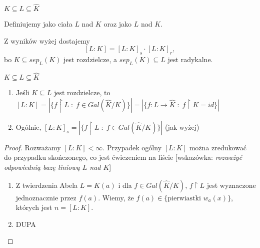 \begin{bbox}
$K\subseteq L\subseteq\hat{K}$

Definiujemy  jako  ciała $L$ nad $K$ oraz  jako  $L$ nad $K$. 
\end{bbox}

Z wyników wyżej dostajemy
$$[L:K]=[L:K]_s\cdot[L:K]_r,$$
bo $K\subseteq sep_L(K)$ jest rozdzielcze, a $sep_L(K)\subseteq L$ jest radykalne.

\begin{remark}
$K\subseteq L\subseteq\hat{K}$
\begin{enumerate}
    \item Jeśli $K\subseteq L$ jest rozdzielcze, to $[L:K]=|\{f\restriction L\;:\;f\in Gal(\hat{K}/K)\}|=|\{f:L\to\hat{K}\;:\;f\restriction K=id\}|$
    \item Ogólnie, $[L:K]_s=|\{f\restriction L\;:\;f\in Gal(\hat{K}/K)\}|$ (jak wyżej)
\end{enumerate}
\end{remark}
\begin{proof}
Rozważamy $[L:K]<\infty$. Przypadek ogólny $[L:K]$ można zredukować do przypadku skończonego, co jest ćwiczeniem na liście [wskazówka: \emph{rozważyć odpowiednią bazę liniową $L$ nad $K$}]
\begin{enumerate}[leftmargin=*]
    \item Z twierdzenia Abela $L=K(a)$ i dla $f\in Gal(\hat{K}/K)$, $f\restriction L$ jest wyznaczone jednoznacznie przez $f(a)$. Wiemy, że $f(a)\in\{\text{pierwiastki }w_a(x)\}$, których jest $n=[L:K]$.
    \item DUPA
\end{enumerate}
\end{proof}





















